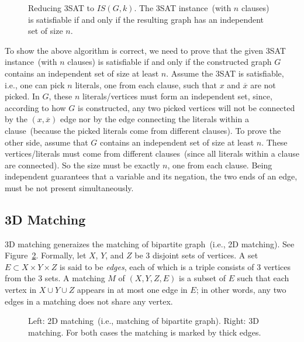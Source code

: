 \begin{figure}[!h]
\centering{}
\caption{Reducing 3SAT to $IS(G,k)$. The 3SAT instance~(with $n$ clauses) is satisfiable
if and only if the resulting graph has an independent set of size $n$.}
\label{fig:3satis}
\end{figure}

To show the above algorithm is correct, we need to prove that the given 3SAT instance~(with $n$ clauses)
is satisfiable if and only if the constructed graph $G$ contains an independent set of size at least $n$.
Assume the 3SAT is satisfiable, i.e., one can pick $n$ literals, one from each clause, such that 
$x$ and $\overline{x}$ are not picked. In $G$, these $n$ literals/vertices
must form an independent set, since, according to how $G$ is constructed,
any two picked vertices will not be connected by the $(x,\overline{x})$ edge
nor by the edge connecting the literals within a clause~(because the picked literals
come from different clauses). To prove the other side, assume that $G$ contains
an independent set of size at least $n$. These vertices/literals must come from different clauses~(since
all literals within a clause are connected). 
So the size must be exactly $n$, one from each clause. 
Being independent guarantees that 
a variable and its negation, the two ends of an edge, must be not present simultaneously.



\subsection*{3D Matching}

3D matching generaizes the matching of bipartite graph~(i.e., 2D matching).
See Figure~\ref{fig:3dmatching}.
Formally, let $X$, $Y$, and $Z$ be 3 disjoint sets of vertices. 
A set $E\subset X\times Y \times Z$ is said to be \emph{edges},
each of which is a triple consists of 3 vertices from the 3 sets.
A matching $M$ of $(X,Y,Z,E)$ is a subset of $E$ such that
each vertex in $X\cup Y \cup Z$ appears in at most one edge in $E$;
in other words, any two edges in a matching does not share any vertex.

\begin{figure}[!h]
\centering{}
\caption{Left: 2D matching~(i.e., matching of bipartite graph). Right: 3D matching.
For both cases the matching is marked by thick edges.}
\label{fig:3dmatching}
\end{figure}

